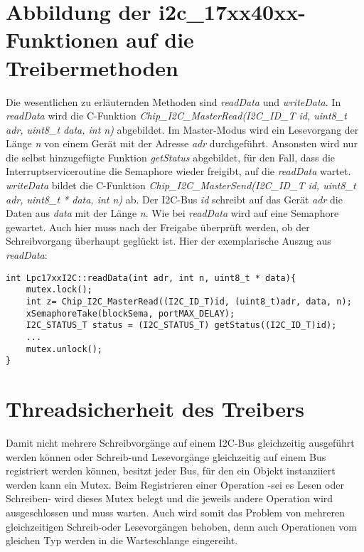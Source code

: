 \section{Abbildung der i2c\_17xx40xx-Funktionen auf die Treibermethoden}
Die wesentlichen zu erläuternden Methoden sind {\textit{readData}} und {\textit{writeData}}.
In {\textit{readData}} wird die C-Funktion {\textit{Chip\_I2C\_MasterRead(I2C\_ID\_T id, uint8\_t adr, uint8\_t data, int n)}} abgebildet. Im Master-Modus wird ein Lesevorgang der Länge {\textit{n}} von einem Gerät mit der Adresse {\textit{adr}} durchgeführt. Ansonsten wird nur die selbst hinzugefügte Funktion {\textit{getStatus}} abgebildet, für den Fall, dass die Interruptserviceroutine die Semaphore wieder freigibt, auf die {\textit{readData}} wartet.\\
{\textit{writeData}} bildet die C-Funktion {\textit{Chip\_I2C\_MasterSend(I2C\_ID\_T id, uint8\_t adr, uint8\_t * data, int n)}} ab. Der I2C-Bus {\textit{id}} schreibt auf das Gerät {\textit{adr}} die Daten aus {\textit{data}} mit der Länge {\textit{n}}. Wie bei {\textit{readData}} wird auf eine Semaphore gewartet. Auch hier muss nach der Freigabe überprüft werden, ob der Schreibvorgang überhaupt geglückt ist. Hier der exemplarische Auszug aus {\textit{readData}}:
\begin{lstlisting}
int Lpc17xxI2C::readData(int adr, int n, uint8_t * data){
	mutex.lock();
	int z= Chip_I2C_MasterRead((I2C_ID_T)id, (uint8_t)adr, data, n);
	xSemaphoreTake(blockSema, portMAX_DELAY);
	I2C_STATUS_T status = (I2C_STATUS_T) getStatus((I2C_ID_T)id);
	...	
	mutex.unlock();
}
\end{lstlisting}

\section{Threadsicherheit des Treibers}
Damit nicht mehrere Schreibvorgänge auf einem I2C-Bus gleichzeitig ausgeführt werden können oder Schreib-und Lesevorgänge gleichzeitig auf einem Bus registriert werden können, besitzt jeder Bus, für den ein Objekt instanziiert werden kann ein Mutex. Beim Registrieren einer Operation -sei es Lesen oder Schreiben- wird dieses Mutex belegt und die jeweils andere Operation wird ausgeschlossen und muss warten. Auch wird somit das Problem von mehreren gleichzeitigen Schreib-oder Lesevorgängen behoben, denn auch Operationen vom gleichen Typ werden in die Warteschlange eingereiht.

